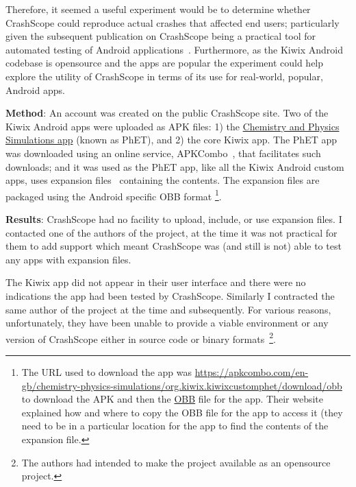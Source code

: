 Therefore, it seemed a useful experiment would be to determine whether CrashScope could reproduce actual crashes that affected end users; particularly given the subsequent publication on CrashScope being a practical tool for automated testing of Android applications~\citep{moran2017_crashscope_a_practical_tool_for_automated_testing_of_android_apps}.  Furthermore, as the Kiwix Android codebase is opensource and the apps are popular the experiment could help explore the utility of CrashScope in terms of its use for real-world, popular, Android apps.

\textbf{Method}: An account was created on the public CrashScope site. Two of the Kiwix Android apps were uploaded as APK files: 1) the \href{https://play.google.com/store/apps/details?id=org.kiwix.kiwixcustomphet}{Chemistry and Physics Simulations app} (known as PhET), and 2) the core Kiwix app. The PhET app was downloaded using an online service, APKCombo~\citep{apkcombo_website_about_us}, that facilitates such downloads; and it was used as the PhET app, like all the Kiwix Android custom apps, uses expansion files~\citep{apk_expansion_files} containing the contents. The expansion files are packaged using the Android specific OBB format
%
\footnote{The URL used to download the app was \url{https://apkcombo.com/en-gb/chemistry-physics-simulations/org.kiwix.kiwixcustomphet/download/obb} to download the APK and then the \href{glossary-obb-file-format}{OBB} file for the app. Their website explained how and where to copy the OBB file for the app to access it (they need to be in a particular location for the app to find the contents of the expansion file.}.

\textbf{Results}: 
CrashScope had no facility to upload, include, or use expansion files. I contacted one of the authors of the project, at the time it was not practical for them to add support which meant CrashScope was (and still is not) able to test any apps with expansion files.

The Kiwix app did not appear in their user interface and there were no indications the app had been tested by CrashScope. Similarly I contracted the same author of the project at the time and subsequently. For various reasons, unfortunately, they have been unable to provide a viable environment or any version of CrashScope either in source code or binary formats~\footnote{The authors had intended to make the project available as an opensource project.}.


